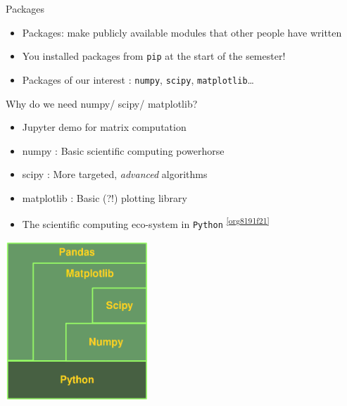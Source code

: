 \documentclass[presentation]{beamer}
\begin{document}
\begin{frame}[label={sec:org8bb5ed0},fragile]{Packages}
 \begin{itemize}
\item Packages: make publicly available modules that other people have written
\item You installed packages from \texttt{pip} at the start of the semester!
\item Packages of our interest : \texttt{numpy}, \texttt{scipy}, \texttt{matplotlib}\ldots{}
\end{itemize}
\end{frame}
\begin{frame}[label={sec:orga2c3c33},fragile]{Why do we need numpy/ scipy/ matplotlib?}
 \begin{itemize}
\item \alert{Jupyter demo} for matrix computation
\item \alert{numpy} : Basic scientific computing powerhorse
\item \alert{scipy} : More targeted, \emph{advanced} algorithms
\item \alert{matplotlib} : Basic (?!) plotting library
\item The scientific computing eco-system in \texttt{Python} \textsuperscript{\ref{org8191f21}}
\end{itemize}
\begin{center}
\includegraphics[width=0.4\textwidth]{images/python_numerics.png}
\end{center}
\end{frame}

\end{document}
